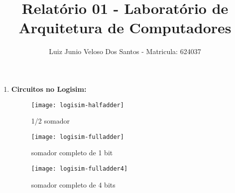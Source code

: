 \documentclass[a4paper,11pt]{article}
\title{\vspace{-4cm}Relatório 01 - Laboratório de Arquitetura de Computadores}
\author{Luiz Junio Veloso Dos Santos - Matricula: 624037}
\begin{document}
 

\maketitle

\begin{enumerate}
    \item \textbf{Circuitos no Logisim:}
        \begin{figure}[ht]
            \caption{1/2 somador}
            \centering
            \texttt{[image: logisim-halfadder]}
        \end{figure}                                                      
        \begin{figure}[ht]
            \caption{somador completo de 1 bit}
            \centering
            \texttt{[image: logisim-fulladder]}
        \end{figure}                                                     
        \begin{figure}[ht]
            \caption{somador completo de 4 bits}
            \centering
            \texttt{[image: logisim-fulladder4]}
        \end{figure}                                                     
\end{enumerate}
\end{document}
